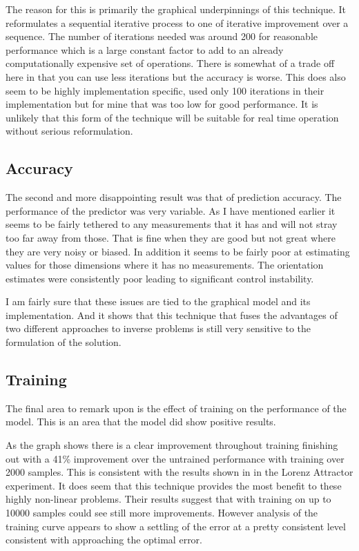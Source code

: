 \documentclass[]{../resources/final_report}
\begin{document}
The reason for this is primarily the graphical underpinnings of this technique. It reformulates a sequential iterative process to one of iterative improvement over a sequence. The number of iterations needed was around 200 for reasonable performance which is a large constant factor to add to an already computationally expensive set of operations. There is somewhat of a trade off here in that you can use less iterations but the accuracy is worse. This does also seem to be highly implementation specific, \cite{Satorras2019CombiningGA} used only 100 iterations in their implementation but for mine that was too low for good performance.
It is unlikely that this form of the technique will be suitable for real time operation without serious reformulation.

\subsection{Accuracy}

The second and more disappointing result was that of prediction accuracy. The performance of the predictor was very variable. As I have mentioned earlier it seems to be fairly tethered to any measurements that it has and will not stray too far away from those. That is fine when they are good but not great where they are very noisy or biased. In addition it seems to be fairly poor at estimating values for those dimensions where it has no measurements. The orientation estimates were consistently poor leading to significant control instability.

I am fairly sure that these issues are tied to the graphical model and its implementation. And it shows that this technique that fuses the advantages of two different approaches to inverse problems is still very sensitive to the formulation of the solution. 

\pagebreak

\subsection{Training}

The final area to remark upon is the effect of training on the performance of the model. This is an area that the model did show positive results. 

As the graph shows there is a clear improvement throughout training finishing out with a 41\% improvement over the untrained performance with training over 2000 samples. 
This is consistent with the results shown in \cite{Satorras2019CombiningGA} in the Lorenz Attractor experiment. It does seem that this technique provides the most benefit to these highly non-linear problems. Their results suggest that with training on up to 10000 samples could see still more improvements. However analysis of the training curve appears to show a settling of the error at a pretty consistent level consistent with approaching the optimal error.
\end{document}
